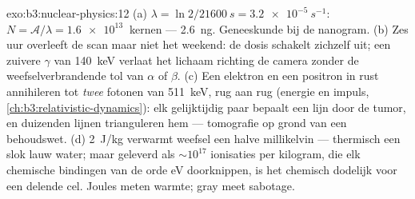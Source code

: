 \begin{solution}{exo:b3:nuclear-physics:12}
(a) $\lambda = \ln2/\qty{21600}{s} = \qty{3.2e-5}{s^{-1}}$:
$N = \mathcal A/\lambda = \qty{1.6e13}{}$ kernen ---
\qty{2.6}{ng}. Geneeskunde bij de nanogram. (b) Zes uur overleeft
de scan maar niet het weekend: de dosis schakelt zichzelf uit; een
zuivere $\gamma$ van \qty{140}{keV} verlaat het lichaam richting de camera
zonder de weefselverbrandende tol van $\alpha$ of $\beta$. (c) Een elektron
en een positron in rust annihileren tot \emph{twee}
fotonen van \qty{511}{keV}, rug aan rug (energie en impuls,
\cref{ch:b3:relativistic-dynamics}): elk gelijktijdig paar
bepaalt een lijn door de tumor, en duizenden lijnen
trianguleren hem --- tomografie op grond van een behoudswet. (d)
\qty{2}{J/kg} verwarmt weefsel een halve millikelvin --- thermisch een
slok lauw water; maar geleverd als ${\sim}10^{17}$ ionisaties
per kilogram, die elk chemische bindingen van de orde \unit{eV} doorknippen, is het
chemisch dodelijk voor een delende cel. Joules meten warmte;
gray meet sabotage.
\end{solution}

